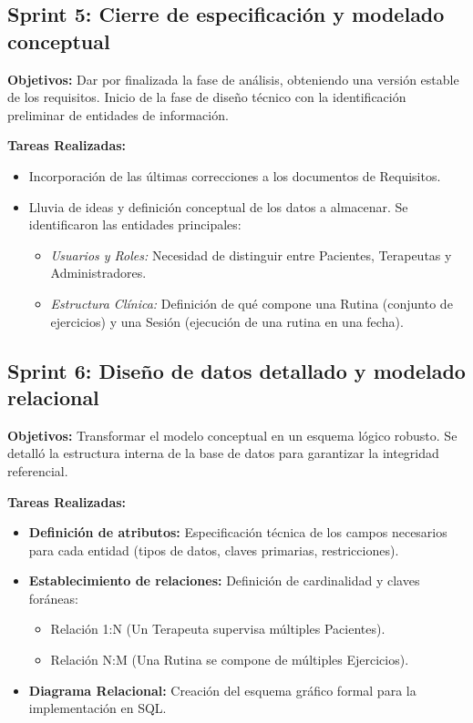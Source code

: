 \subsection{Sprint 5: Cierre de especificación y modelado conceptual}
\textbf{Objetivos:} Dar por finalizada la fase de análisis, obteniendo una versión estable de los requisitos. Inicio de la fase de diseño técnico con la identificación preliminar de entidades de información.

\textbf{Tareas Realizadas:}
\begin{itemize}
    \item Incorporación de las últimas correcciones a los documentos de Requisitos.
    \item Lluvia de ideas y definición conceptual de los datos a almacenar. Se identificaron las entidades principales:
    \begin{itemize}
        \item \textit{Usuarios y Roles:} Necesidad de distinguir entre Pacientes, Terapeutas y Administradores.
        \item \textit{Estructura Clínica:} Definición de qué compone una Rutina (conjunto de ejercicios) y una Sesión (ejecución de una rutina en una fecha).
    \end{itemize}
\end{itemize}

\subsection{Sprint 6: Diseño de datos detallado y modelado relacional}
\textbf{Objetivos:} Transformar el modelo conceptual en un esquema lógico robusto. Se detalló la estructura interna de la base de datos para garantizar la integridad referencial.

\textbf{Tareas Realizadas:}
\begin{itemize}
    \item \textbf{Definición de atributos:} Especificación técnica de los campos necesarios para cada entidad (tipos de datos, claves primarias, restricciones).
    \item \textbf{Establecimiento de relaciones:} Definición de cardinalidad y claves foráneas:
    \begin{itemize}
        \item Relación 1:N (Un Terapeuta supervisa múltiples Pacientes).
        \item Relación N:M (Una Rutina se compone de múltiples Ejercicios).
    \end{itemize}
    \item \textbf{Diagrama Relacional:} Creación del esquema gráfico formal para la implementación en SQL.
\end{itemize}

